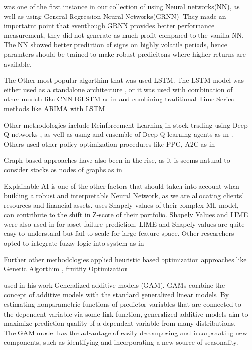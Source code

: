 \documentclass[11pt]{article}
\begin{document}
\cite{ENKE2005} was one of the first instance in our collection of using Neural networks(NN), as well as using General Regression Neural Networks(GRNN). They made an importatnt point that eventhough GRNN provides better performance measurement, they did not generate as much profit compared to the vanilla NN. The NN showed better prediction of signs on highly volatile periods, hence paramters should be trained to make robust predicitons where higher returns are available.

The Other most popular algorthim that was used LSTM. The LSTM model was either used as  a standalone architecture \citep[see][]{Koudjonou2020, shen2021}, or it was used with combination of other models like CNN-BiLSTM as in \cite{wang2021stock} and combining traditional Time Series methods like ARIMA with LSTM \citep[see][]{hua2020}

Other methodologies include Reinforcement Learning in stock trading using Deep Q networks \citep[see][]{dang2019}, as well as using and ensemble of Deep Q-learning agents as in \cite{carta2021}. Others used other policy optimization procedures like PPO, A2C as in \cite{Durall2022}

Graph based approaches have also been in the rise, as it is seems natural to consider stocks as nodes of graphs as in \cite{son2022,Fazli2021}

Explainable AI is one of the other factors that should taken into account when building a robust and interpretable Neural Network, as we are allocating clients' resources and financial assets. \cite{Golnoosh2022} uses Shapely values of their complex ML model, can contribute to the shift in Z-score of their portfolio. Shapely Values and LIME were also used in \cite{Jakubowski2022} for asset failure prediction. LIME and Shapely values are quite easy to understand but fail to scale for large feature space. Other researchers opted to integrate fuzzy logic into system as in \cite{chen2014, xie2021}

Further other methodologies applied heuristic based optimization approaches like Genetic Algorthim \citep[see][]{thakkar2022information,CHEN_2020}, fruitfly Optimization \citep[see][]{tian2020}

\cite{Sharma2019} used in his work Generalized additive models (GAM). GAMs combine the concept of additive models with the standard generalized linear models. By estimating nonparametric functions of predictor variables that are connected to the dependent variable via some link function, generalized additive models aim to maximize prediction quality of a dependent variable from many distributions. The GAM model has the advantage of easily decomposing and incorporating new components, such as identifying and incorporating a new source of seasonality.
\end{document}
